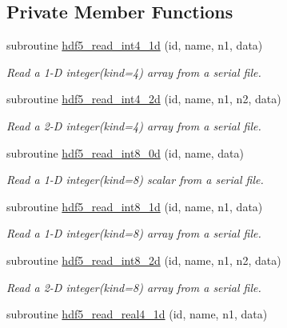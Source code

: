 \subsection*{Private Member Functions}
\begin{DoxyCompactItemize}
\item 
subroutine \hyperlink{interfacemodhdf5_1_1hdf5__read__data_a484bfd3272dfc507ab6f7ee71bd60232}{hdf5\+\_\+read\+\_\+int4\+\_\+1d} (id, name, n1, data)
\begin{DoxyCompactList}\small\item\em Read a 1-\/D integer(kind=4) array from a serial file. \end{DoxyCompactList}\item 
subroutine \hyperlink{interfacemodhdf5_1_1hdf5__read__data_aebc8b06d547dd0b0a64e8d76bf9b933e}{hdf5\+\_\+read\+\_\+int4\+\_\+2d} (id, name, n1, n2, data)
\begin{DoxyCompactList}\small\item\em Read a 2-\/D integer(kind=4) array from a serial file. \end{DoxyCompactList}\item 
subroutine \hyperlink{interfacemodhdf5_1_1hdf5__read__data_a4b43a721044be9ae8155dcff0dc54753}{hdf5\+\_\+read\+\_\+int8\+\_\+0d} (id, name, data)
\begin{DoxyCompactList}\small\item\em Read a 1-\/D integer(kind=8) scalar from a serial file. \end{DoxyCompactList}\item 
subroutine \hyperlink{interfacemodhdf5_1_1hdf5__read__data_ae4d30f084b576d04638ddc6c8d35a490}{hdf5\+\_\+read\+\_\+int8\+\_\+1d} (id, name, n1, data)
\begin{DoxyCompactList}\small\item\em Read a 1-\/D integer(kind=8) array from a serial file. \end{DoxyCompactList}\item 
subroutine \hyperlink{interfacemodhdf5_1_1hdf5__read__data_aac8b36f082332a365fc9f89d1f7df37a}{hdf5\+\_\+read\+\_\+int8\+\_\+2d} (id, name, n1, n2, data)
\begin{DoxyCompactList}\small\item\em Read a 2-\/D integer(kind=8) array from a serial file. \end{DoxyCompactList}\item 
subroutine \hyperlink{interfacemodhdf5_1_1hdf5__read__data_a8ffa6d8d59ce7a75ff6f2e36ebacc154}{hdf5\+\_\+read\+\_\+real4\+\_\+1d} (id, name, n1, data)

\end{DoxyCompactItemize}
